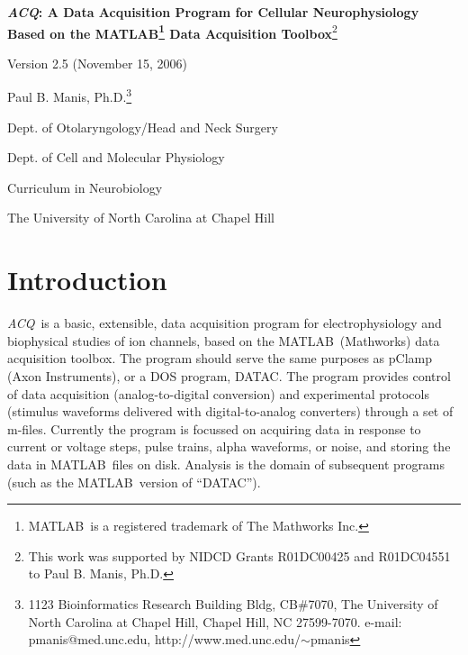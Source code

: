\documentclass[11pt, letterpaper, titlepage]{paper}
\newcommand{\acq}{\textsl{ACQ}}
\newcommand{\ml}{\textsf{MATLAB}}
\begin{document}
\begin{titlepage}
\begin{center}
\begin{spacing}{2.0}
\parskip0in
 \textbf{\Large {\acq: A Data Acquisition Program for Cellular Neurophysiology 
Based on the \ml\footnote{\ml\ is a registered trademark of The Mathworks Inc.}
 Data Acquisition Toolbox}}\footnote{This work was supported by NIDCD Grants R01DC00425 and R01DC04551 to Paul B. Manis, 
Ph.D.}



Version 2.5 (November 15, 2006)

Paul B. Manis, Ph.D.\footnote{1123 Bioinformatics Research Building Bldg, CB\#7070, The University of North Carolina at Chapel Hill,
Chapel Hill, NC 27599-7070. e-mail: pmanis@med.unc.edu, http://www.med.unc.edu/$\sim$pmanis}

Dept. of Otolaryngology/Head and Neck Surgery

Dept. of Cell and Molecular Physiology

Curriculum in Neurobiology

The University of North Carolina at Chapel Hill


\end{spacing}
\end{center}





\end{titlepage}

\tableofcontents
\newpage
\parindent0in
\parskip6pt %

\section{Introduction}

\acq\ is a basic, extensible, data acquisition program for electrophysiology and 
biophysical studies of ion channels, based on the \ml\ (Mathworks) data acquisition 
toolbox. The program should serve the same purposes as pClamp (Axon Instruments), or a 
DOS program, DATAC. The program provides control of data acquisition (analog-to-digital 
conversion) and experimental protocols (stimulus waveforms delivered with 
digital-to-analog converters) through a set of m-files. Currently the program is focussed 
on acquiring data in response to current or voltage steps, pulse trains, alpha waveforms, 
or noise, and storing the data in \ml\ files on disk. Analysis is the domain of 
subsequent programs (such as the \ml\ version of ``DATAC'').
\end{document}
